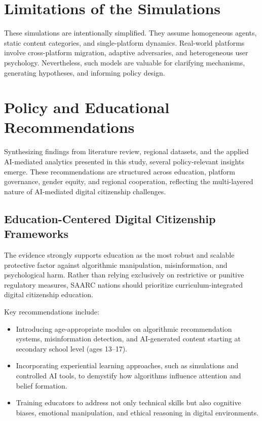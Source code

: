 \documentclass[12pt,a4paper]{report}
\begin{document}
\section{Limitations of the Simulations}

These simulations are intentionally simplified. They assume homogeneous agents, static content categories, and single-platform dynamics. Real-world platforms involve cross-platform migration, adaptive adversaries, and heterogeneous user psychology. Nevertheless, such models are valuable for clarifying mechanisms, generating hypotheses, and informing policy design.


\section{Policy and Educational Recommendations}

Synthesizing findings from literature review, regional datasets, and the applied AI-mediated analytics presented in this study, several policy-relevant insights emerge. These recommendations are structured across education, platform governance, gender equity, and regional cooperation, reflecting the multi-layered nature of AI-mediated digital citizenship challenges.

\subsection{Education-Centered Digital Citizenship Frameworks}

The evidence strongly supports education as the most robust and scalable protective factor against algorithmic manipulation, misinformation, and psychological harm. Rather than relying exclusively on restrictive or punitive regulatory measures, SAARC nations should prioritize curriculum-integrated digital citizenship education.

Key recommendations include:
\begin{itemize}
  \item Introducing age-appropriate modules on algorithmic recommendation systems, misinformation detection, and AI-generated content starting at secondary school level (ages 13–17).
  \item Incorporating experiential learning approaches, such as simulations and controlled AI tools, to demystify how algorithms influence attention and belief formation.
  \item Training educators to address not only technical skills but also cognitive biases, emotional manipulation, and ethical reasoning in digital environments.
\end{itemize}
\end{document}
